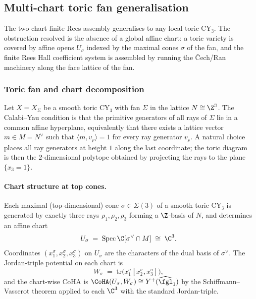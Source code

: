 \subsection{Multi-chart toric fan generalisation}
\label{sec:gluing-p2-multi-chart}

The two-chart finite Rees assembly generalises to any local toric CY$_3$. The
obstruction resolved is the absence of a global affine chart: a toric
variety is covered by affine opens $U_\sigma$ indexed by the maximal
cones $\sigma$ of the fan, and the finite Rees Hall coefficient system is
assembled by running the \v{C}ech/Ran machinery along the face lattice of
the fan.

\subsubsection{Toric fan and chart decomposition}

Let $X = X_\Sigma$ be a smooth toric CY$_3$ with fan $\Sigma$ in the lattice
$N \cong \Z^3$. The Calabi--Yau condition is that the primitive generators
of all rays of $\Sigma$ lie in a common affine hyperplane, equivalently
that there exists a lattice vector $m \in M = N^\vee$ such that
$\langle m, v_\rho \rangle = 1$ for every ray generator $v_\rho$. A
natural choice places all ray generators at height $1$ along the
last coordinate; the toric diagram is then the $2$-dimensional polytope
obtained by projecting the rays to the plane $\{x_3 = 1\}$.

\paragraph{Chart structure at top cones.}
Each maximal (top-dimensional) cone $\sigma \in \Sigma(3)$ of a smooth
toric CY$_3$ is generated by exactly three rays
$\rho_1, \rho_2, \rho_3$ forming a $\Z$-basis of $N$, and determines an
affine chart
\[
 U_\sigma \;=\; \mathrm{Spec}\,\C[\sigma^\vee \cap M] \;\cong\; \C^3.
\]
Coordinates $(x_1^\sigma, x_2^\sigma, x_3^\sigma)$ on $U_\sigma$ are the
characters of the dual basis of $\sigma^\vee$. The Jordan-triple
potential on each chart is
\[
 W_\sigma \;=\; \mathrm{tr}\bigl(x_1^\sigma [x_2^\sigma, x_3^\sigma]\bigr),
\]
and the chart-wise CoHA is $\CoHA(U_\sigma, W_\sigma) \cong
Y^+(\widehat{\fgl}_1)$ by the Schiffmann--Vasserot theorem applied to each
$\C^3$ with the standard Jordan-triple.

